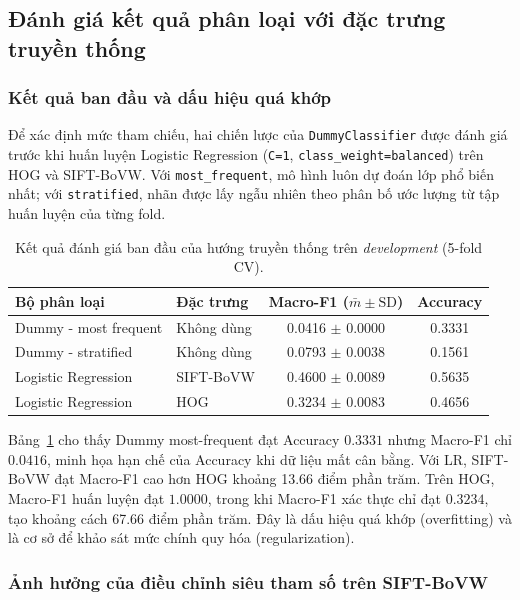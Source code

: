 \subsection{Đánh giá kết quả phân loại với đặc trưng truyền thống}
\label{sec:traditional}

\subsubsection{Kết quả ban đầu và dấu hiệu quá khớp}
\label{subsec:tradbase}
Để xác định mức tham chiếu, hai chiến lược của \texttt{DummyClassifier} được đánh giá trước khi huấn luyện Logistic Regression (\texttt{C=1}, \texttt{class\_weight=balanced}) trên HOG và SIFT-BoVW. Với \texttt{most\_frequent}, mô hình luôn dự đoán lớp phổ biến nhất; với \texttt{stratified}, nhãn được lấy ngẫu nhiên theo phân bố ước lượng từ tập huấn luyện của từng fold.

\begin{table}[H]\centering\caption{Kết quả đánh giá ban đầu của hướng truyền thống trên \textit{development} (5-fold CV).}\label{tab:tradbase}
\small\begin{tabular}{@{}llcc@{}}\toprule
Bộ phân loại & Đặc trưng & Macro-F1 ($\bar m\pm\mathrm{SD}$) & Accuracy\\\midrule
Dummy - most frequent & Không dùng & 0.0416 $\pm$ 0.0000 & 0.3331\\
Dummy - stratified & Không dùng & 0.0793 $\pm$ 0.0038 & 0.1561\\
Logistic Regression & SIFT-BoVW & 0.4600 $\pm$ 0.0089 & 0.5635\\
Logistic Regression & HOG & 0.3234 $\pm$ 0.0083 & 0.4656\\\bottomrule
\end{tabular}\end{table}

Bảng~\ref{tab:tradbase} cho thấy Dummy most-frequent đạt Accuracy $0.3331$ nhưng Macro-F1 chỉ $0.0416$, minh họa hạn chế của Accuracy khi dữ liệu mất cân bằng. Với LR, SIFT-BoVW đạt Macro-F1 cao hơn HOG khoảng 13.66 điểm phần trăm. Trên HOG, Macro-F1 huấn luyện đạt $1.0000$, trong khi Macro-F1 xác thực chỉ đạt $0.3234$, tạo khoảng cách 67.66 điểm phần trăm. Đây là dấu hiệu quá khớp (overfitting) và là cơ sở để khảo sát mức chính quy hóa (regularization).

\subsubsection{Ảnh hưởng của điều chỉnh siêu tham số trên SIFT-BoVW}
\label{subsec:sift}

